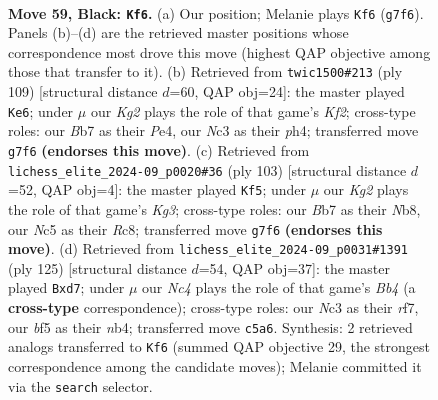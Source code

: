 \documentclass[11pt]{article}
\begin{document}
\clearpage

\begin{figure}[p]\centering
\begin{subfigure}{0.46\textwidth}\centering
\resizebox{\linewidth}{!}{%
\newchessgame
\chessboard[
  setfen={8/Pb4k1/8/2n2BN1/1pN2P2/1Pn3P1/5K1P/R7 b - - 0 59},
  showmover=false,
  pgfstyle=straightmove, color=movearrow, markmove={g7-f6}
]}
\caption{}
\end{subfigure}\hfill
\begin{subfigure}{0.46\textwidth}\centering
\resizebox{\linewidth}{!}{%
\newchessgame
\chessboard[
  setfen={8/5k2/8/p4N2/P3p1PP/1Pn5/5PK1/8 b - - 1 55},
  showmover=false,
  pgfstyle=straightmove, color=movearrow, markmove={f7-e6}
]}
\caption{}
\end{subfigure}
\\[4pt]
\begin{subfigure}{0.46\textwidth}\centering
\resizebox{\linewidth}{!}{%
\newchessgame
\chessboard[
  setfen={1nr5/1R6/4p1k1/1P2N3/p7/2P1P3/KP3P2/8 b - - 2 52},
  showmover=false,
  pgfstyle=straightmove, color=movearrow, markmove={g6-f5}
]}
\caption{}
\end{subfigure}\hfill
\begin{subfigure}{0.46\textwidth}\centering
\resizebox{\linewidth}{!}{%
\newchessgame
\chessboard[
  setfen={1k6/3P1R2/1n2P3/1b5p/1Np1P3/p1P5/3K4/r7 b - - 0 63},
  showmover=false,
  pgfstyle=straightmove, color=movearrow, markmove={b5-d7}
]}
\caption{}
\end{subfigure}
\caption{\textbf{Move 59, Black: \texttt{Kf6}.} (a) Our position; Melanie plays \texttt{Kf6} (\texttt{g7f6}). Panels (b)--(d) are the retrieved master positions whose correspondence most drove this move (highest QAP objective among those that transfer to it). (b) Retrieved from \texttt{twic1500\#213} (ply 109) [structural distance $d$=60, QAP obj=24]: the master played \texttt{Ke6}; under $\mu$ our \emph{Kg2} plays the role of that game's \emph{Kf2}; cross-type roles: our \emph{B}b7 as their \emph{P}e4, our \emph{N}c3 as their \emph{p}h4; transferred move \texttt{g7f6} \textbf{(endorses this move)}. (c) Retrieved from \texttt{lichess\_elite\_2024-09\_p0020\#36} (ply 103) [structural distance $d$=52, QAP obj=4]: the master played \texttt{Kf5}; under $\mu$ our \emph{Kg2} plays the role of that game's \emph{Kg3}; cross-type roles: our \emph{B}b7 as their \emph{N}b8, our \emph{N}c5 as their \emph{R}c8; transferred move \texttt{g7f6} \textbf{(endorses this move)}. (d) Retrieved from \texttt{lichess\_elite\_2024-09\_p0031\#1391} (ply 125) [structural distance $d$=54, QAP obj=37]: the master played \texttt{Bxd7}; under $\mu$ our \emph{Nc4} plays the role of that game's \emph{Bb4} (a \textbf{cross-type} correspondence); cross-type roles: our \emph{N}c3 as their \emph{r}f7, our \emph{b}f5 as their \emph{n}b4; transferred move \texttt{c5a6}. Synthesis: 2 retrieved analogs transferred to \texttt{Kf6} (summed QAP objective 29, the strongest correspondence among the candidate moves); Melanie committed it via the \texttt{search} selector.}
\label{fig:thought-m117}
\end{figure}
\end{document}
